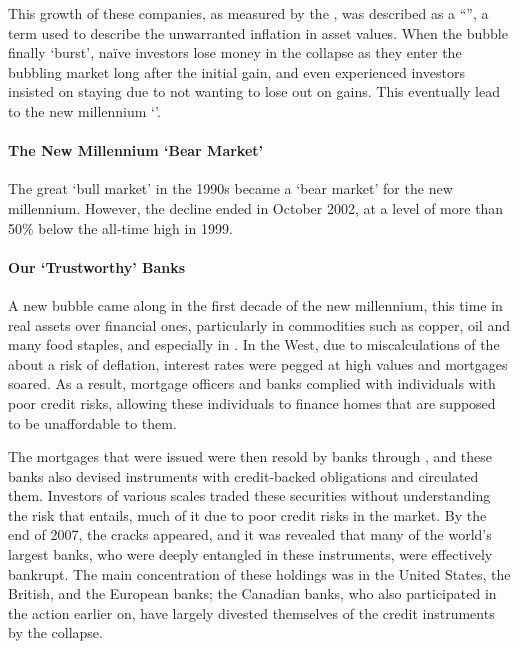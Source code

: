 \documentclass[notoc,notitlepage]{tufte-book}
\begin{document}
This growth of these companies,
as measured by the ,
was described as a ``'',
a term used to describe the unwarranted inflation in asset values.
When the bubble finally `burst',
naïve investors lose money in the collapse as they enter the bubbling market
long after the initial gain,
and even experienced investors insisted on staying
due to not wanting to lose out on gains.
This eventually lead to the new millennium `'.

\paragraph{The New Millennium `Bear Market'} 
The great `bull market'  in the 1990s
became a `bear market' 
for the new millennium.
However, the decline ended in October 2002,
at a level of more than 50\% below the all-time high in 1999.

\paragraph{Our `Trustworthy' Banks}
A new bubble came along in the first decade of the new millennium,
this time in real assets over financial ones, particularly in commodities
such as copper, oil and many food staples, and especially in .
In the West, due to miscalculations of the  about
a risk of deflation, interest rates were pegged at high values
and mortgages soared.
As a result, mortgage officers and banks complied with
individuals with poor credit risks, allowing these individuals to finance
homes that are supposed to be unaffordable to them.

The mortgages that were issued were then resold by banks through
,
and these banks also devised instruments with credit-backed obligations
and circulated them.
Investors of various scales traded these securities without understanding
the risk that entails, much of it due to poor credit risks in the market.
By the end of 2007, the cracks appeared, and it was revealed
that many of the world's largest banks,
who were deeply entangled in these instruments,
were effectively bankrupt.
The main concentration of these holdings was in the United States,
the British, and the European banks; the Canadian banks,
who also participated in the action earlier on,
have largely divested themselves of the credit instruments by the collapse.
\end{document}
